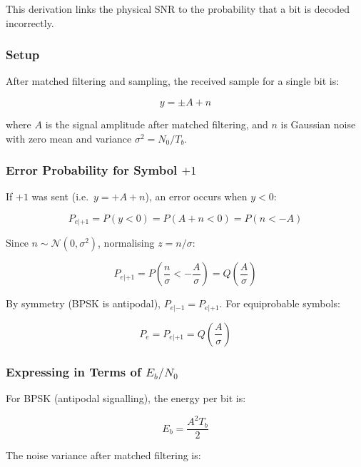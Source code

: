 This derivation links the physical SNR to the probability that a bit is decoded incorrectly.

\subsubsection{Setup}

After matched filtering and sampling, the received sample for a single bit is:

\begin{equation}
y = \pm A + n
\end{equation}

where $A$ is the signal amplitude after matched filtering, and $n$ is Gaussian noise with zero mean and variance $\sigma^2 = N_0/T_b$.

\subsubsection{Error Probability for Symbol $+1$}

If $+1$ was sent (i.e.\ $y = +A + n$), an error occurs when $y < 0$:

\begin{equation}
P_{e|+1} = P(y < 0) = P(A + n < 0) = P(n < -A)
\end{equation}

Since $n \sim \mathcal{N}(0, \sigma^2)$, normalising $z = n/\sigma$:

\begin{equation}
P_{e|+1} = P\!\left(\frac{n}{\sigma} < -\frac{A}{\sigma}\right) = Q\!\left(\frac{A}{\sigma}\right)
\end{equation}

By symmetry (BPSK is antipodal), $P_{e|-1} = P_{e|+1}$. For equiprobable symbols:

\begin{equation}
P_e = P_{e|+1} = Q\!\left(\frac{A}{\sigma}\right)
\end{equation}

\subsubsection{Expressing in Terms of $E_b/N_0$}

For BPSK (antipodal signalling), the energy per bit is:

\begin{equation}
E_b = \frac{A^2 T_b}{2}
\end{equation}

The noise variance after matched filtering is:

